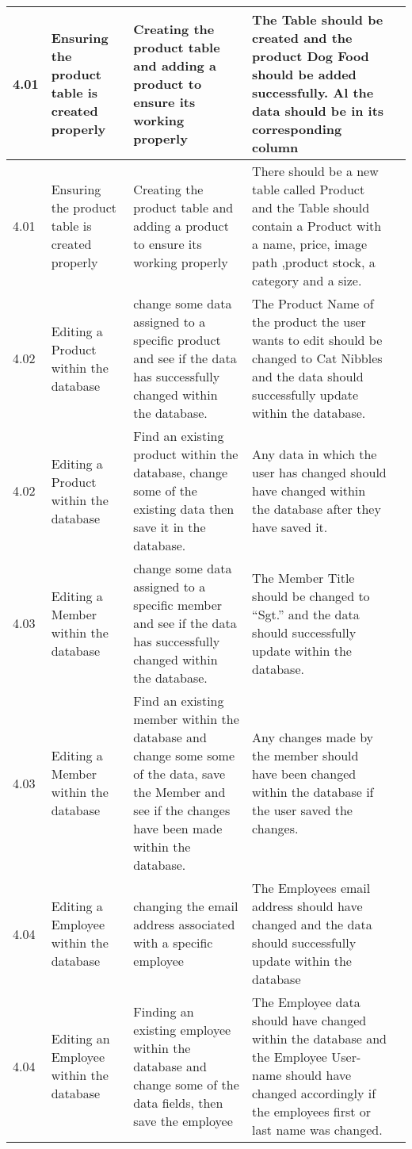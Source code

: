\begin{flushleft}
\begin{longtable}{|p{1cm}|p{2.5cm}|p{2.5cm}|p{2cm}|p{2cm}|}
	\rowcolor{dark-grey}4.01 & Ensuring the product table is created properly & Creating the product table and adding a product to ensure its working properly & The Table should be created and the product Dog Food should be added successfully. Al the data should be in its corresponding column & \\ \hline
	\rowcolor{light-grey}4.01 & Ensuring the product table is created properly & Creating the product table and adding a product to ensure its working properly & There should be a new table called Product and the Table should contain a Product with a name, price, image path ,product stock, a category and a size.& \\ \hline
	\rowcolor{dark-grey}4.02 & Editing a Product within the database &  change some data assigned to a specific product and see if the data has successfully changed within the database. & The Product Name of the product the user wants to edit should be changed to Cat Nibbles and the data should successfully update within the database. & \\ \hline
	\rowcolor{light-grey}4.02 & Editing a Product within the database & Find an existing product within the database, change some of the existing data then save it in the database. & Any data in which the user has changed should have changed within the database after they have saved it. & \\ \hline
	\rowcolor{dark-grey}4.03 & Editing a Member within the database &  change some data assigned to a specific member and see if the data has successfully changed within the database. &  The Member Title should be changed to ``Sgt.'' and the data should successfully update within the database.  & \\ \hline
	\rowcolor{light-grey}4.03 & Editing a Member within the database & Find an existing member within the database and change some some of the data, save the Member and see if the changes have been made within the database. &  Any changes made by the member should have been changed within the database if the user saved the changes.& \\ \hline
	\rowcolor{dark-grey}4.04 & Editing a Employee within the database &  changing the email address associated with a specific employee & The Employees email address should have changed and the data should successfully update within the database& \\ \hline
	\rowcolor{light-grey}4.04 & Editing an Employee within the database &  Finding an existing employee within the database and change some of the data fields, then save the employee & The Employee data should have changed within the database and the Employee User-name should have changed accordingly if the employees first or last name was changed.& \\ \hline

\end{longtable}
\end{flushleft}
